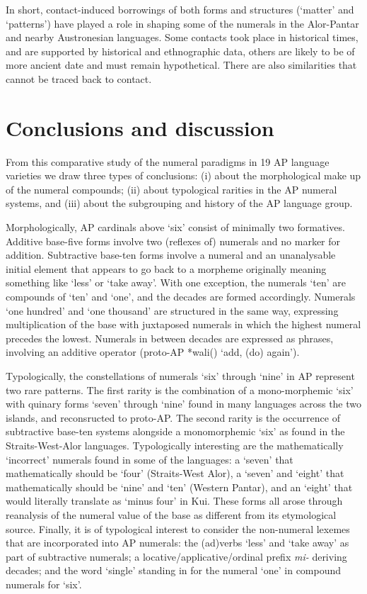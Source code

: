 {In short, contact-induced borrowings of both forms and structures (`matter' and `patterns') have played a role in shaping some of the numerals in the Alor-Pantar and nearby Austronesian languages. Some contacts took place in historical times, and are supported by historical and ethnographic data, others are likely to be of more ancient date and must remain hypothetical. There are also similarities that cannot be traced back to contact.

\section{Conclusions and discussion}
From this comparative study of the numeral paradigms in 19 AP language varieties we draw three types of conclusions: (i) about the morphological make up of the numeral compounds; (ii) about typological rarities in the AP numeral systems, and (iii) about the subgrouping and history of the AP language group.

Morphologically, AP cardinals above `six' consist of minimally two formatives. Additive base-five forms involve two (reflexes of) numerals and no marker for addition. Subtractive base-ten forms involve a numeral and an unanalysable initial element that appears to go back to a morpheme originally meaning something like `less' or `take away'. With one exception, the numerals `ten' are compounds of `ten' and `one', and the decades are formed accordingly. Numerals `one hundred' and `one thousand' are structured in the same way, expressing multiplication of the base with juxtaposed numerals in which the highest numeral precedes the lowest. Numerals in between decades are expressed as phrases, involving an additive operator (proto-AP *wali({\ng}) `add, (do) again').

Typologically, the constellations of numerals `six' through `nine' in AP represent two rare patterns. The first rarity is the combination of a mono-morphemic `six' with quinary forms `seven' through `nine' found in many languages across the two islands, and reconsructed to proto-AP. The second rarity is the occurrence of subtractive base-ten systems alongside a monomorphemic `six' as found in the Straits-West-Alor languages. Typologically interesting are the mathematically `incorrect' numerals found in some of the languages: a `seven' that mathematically should be `four' (Straits-West Alor), a `seven' and `eight' that mathematically should be `nine' and `ten' (Western Pantar), and an `eight' that would literally translate as `minus four' in Kui. These forms all arose through reanalysis of the numeral value of the base as different from its etymological source. Finally, it is of typological interest to consider the non-numeral lexemes that are incorporated into AP numerals: the (ad)verbs `less' and `take away' as part of subtractive numerals; a locative/applicative/ordinal prefix \textit{mi-} deriving decades; and the word `single' standing in for the numeral `one' in compound numerals for `six'.

}
